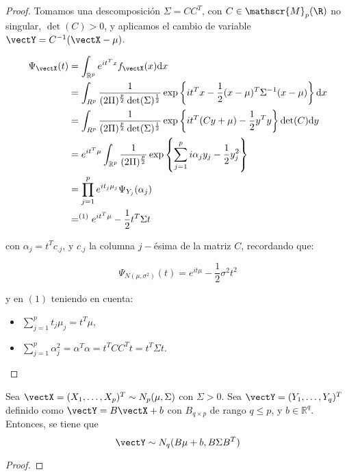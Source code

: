   
  \begin{proof}
    Tomamos una descomposición $\Sigma = CC^T$, con $C\in \mathscr{M}_{p}(\R)$ no singular, $\det(C) > 0$, y aplicamos el cambio de variable $\vectY = C^{-1}(\vectX - \mu)$.
    
    \[
    \begin{split}
      \Psi_{\vectX}(t) & = \int_{\mathbb R^p} e^{it^T x} f_{\vectX} (x) \mathrm{d}x \\
      & = \int_{R^p} \frac{1}{(2\Pi)^{\frac{p}{2}}\det(\Sigma)^{\frac{1}{2}}} \exp \left\{ it^Tx - \frac{1}{2}(x-\mu)^T\Sigma^{-1}(x-\mu) \right\}\mathrm{d}x \\
      & =  \int_{R^p} \frac{1}{(2\Pi)^{\frac{p}{2}}\det(\Sigma)^{\frac{1}{2}}} \exp \left\{ it^T(Cy + \mu)- \frac{1}{2}y^Ty \right\} \det(C)\mathrm{d}y \\
      & = e^{it^T\mu} \int_{\mathbb R^p} \frac{1}{(2\Pi)^{\frac{p}{2}}} \exp \left\{ \sum_{j=1}^p i\alpha_j y_j -  \frac{1}{2}y_j^2 \right\} \\
      & = \prod_{j=1}^p e^{it_j\mu_j}\Psi_{Y_j}(\alpha_j) \\
      & =^{(1)} e^{it^T \mu}- \frac{1}{2}t^T \Sigma t
    \end{split}
    \]
    
    con $\alpha_j = t^T c_{.j}$, y $c_{.j}$ la columna $j-$ésima de la matriz $C$, recordando que:
    
    \[
    \Psi_{N(\mu,\sigma^2)}(t) = e^{it\mu} - \frac{1}{2}\sigma^2 t^2
    \]
    
    y en $(1)$ teniendo en cuenta:
    
    \begin{itemize}
    \item $ \sum_{j=1}^p t_j \mu_j = t^T \mu$,
    \item $\sum_{j = 1}^p \alpha_j^2 = \alpha^T \alpha = t^T CC^T t = t^T \Sigma t$.
    \end{itemize}

  \end{proof}

 
    \begin{nprop}
      Sea $\vectX = (X_1,\dots,X_p)^T \sim N_p(\mu,\Sigma)$ con $\Sigma > 0$. Sea $\vectY = (Y_1,\dots,Y_q)^T$ definido como $\vectY = B\vectX + b$ con $B_{q\times p}$ de rango $q \leq p$, y $b \in \mathbb R^q$. Entonces, se tiene que
      \[
\vectY \sim N_q(B\mu+b,B\Sigma B^T)
      \]
    \end{nprop}
    \begin{proof}
    \end{proof}

